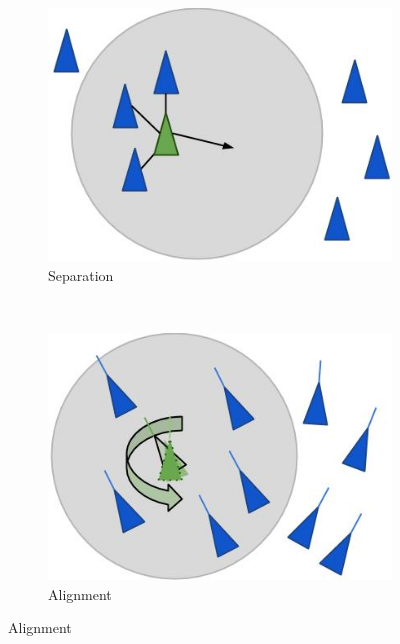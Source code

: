 \begin{figure}[h!]
        \centering
        \begin{subfigure}[b]{0.3\textwidth}
                \includegraphics[width=\textwidth]{images/boid_separation.jpg}
                \caption{Separation}
                \label{fig:boidsep}
        \end{subfigure}%
        ~ 
		\begin{subfigure}[b]{0.3\textwidth}
		\includegraphics[width=\textwidth]{images/boid_alignment1.jpg}
		                \caption{Alignment}
		                \label{fig:boidali}
		\end{subfigure}


\end{figure}
